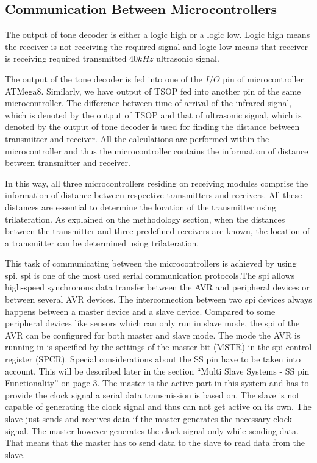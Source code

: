 \subsection{Communication Between Microcontrollers}
The output of tone decoder is either a logic high or a logic low. Logic high means the receiver is not receiving the required signal and logic low means that receiver is receiving required transmitted $40kHz$ ultrasonic signal.

The output of the tone decoder is fed into one of the $I/O$ pin of microcontroller ATMega8. Similarly, we have output of TSOP fed into another pin of the same microcontroller. The difference between time of arrival of the infrared signal, which is denoted by the output of TSOP and that of ultrasonic signal, which is denoted by the output of tone decoder is used for finding the distance between transmitter and receiver. All the calculations are performed within the microcontroller and thus the microcontroller contains the information of distance between transmitter and receiver.

In this way, all three microcontrollers residing on receiving modules comprise the information of distance between respective transmitters and receivers. All these distances are essential to determine the location of the transmitter using trilateration. As explained on the methodology section, when the distances between the transmitter and three predefined receivers are known, the location of a transmitter can be determined using trilateration.

This task of communicating between the microcontrollers is achieved by using \gls{spi}. \gls{spi} is one of the most used serial communication protocols.The \gls{spi} allows high-speed synchronous data transfer between the AVR and peripheral devices or between several AVR devices. The interconnection between two \gls{spi} devices always happens between a master device and a slave device. Compared to some peripheral devices like sensors which can only run in slave mode, the \gls{spi} of the AVR can be configured for both master and slave mode. The mode the AVR is running in is specified by the settings of the master bit (MSTR) in the \gls{spi} control register (SPCR). Special considerations about the SS pin have to be taken into account. This will be described later in the section “Multi Slave Systems - SS pin Functionality” on page 3. The master is the active part in this system and has to provide the clock signal a serial data transmission is based on. The slave is not capable of generating the clock signal and thus can not get active on its own. The slave just sends and receives data if the master generates the necessary clock signal. The master however generates the clock signal only while sending data. That means that the master has to send data to the slave to read data from the slave.

